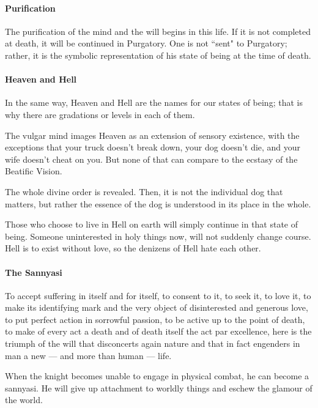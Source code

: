 \paragraph{Purification}
The purification of the mind and the will begins in this life. If it is not completed at death, it will be continued in Purgatory. One is not ``sent" to Purgatory; rather, it is the symbolic representation of his state of being at the time of death.

\paragraph{Heaven and Hell}
In the same way, Heaven and Hell are the names for our states of being; that is why there are gradations or levels in each of them.

The vulgar mind images Heaven as an extension of sensory existence, with the exceptions that your truck doesn't break down, your dog doesn't die, and your wife doesn't cheat on you. But none of that can compare to the ecstasy of the Beatific Vision.

The whole divine order is revealed. Then, it is not the individual dog that matters, but rather the essence of the dog is understood in its place in the whole.

Those who choose to live in Hell on earth will simply continue in that state of being. Someone uninterested in holy things now, will not suddenly change course. Hell is to exist without love, so the denizens of Hell hate each other.

\paragraph{The Sannyasi}
\begin{quotex}
To accept suffering in itself and for itself, to consent to it, to seek it, to love it, to make its identifying mark and the very object of disinterested and generous love, to put perfect action in sorrowful passion, to be active up to the point of death, to make of every act a death and of death itself the act par excellence, here is the triumph of the will that disconcerts again nature and that in fact engenders in man a new — and more than human — life. 

\end{quotex}
When the knight becomes unable to engage in physical combat, he can become a sannyasi. He will give up attachment to worldly things and eschew the glamour of the world.


